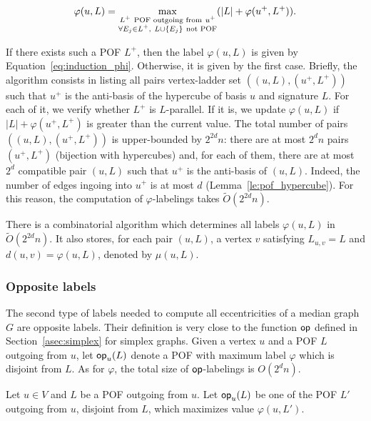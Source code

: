 \documentclass[a4paper,UKenglish,numberwithinsect,cleveref, autoref,anonymous]{lipics-v2021}
\newcommand{\set}[1]{\left\{ #1 \right\}}
\newcommand{\card}[1]{\left| #1 \right|}
\newcommand{\opp}{\mbox{\textsf{op}}}
\begin{document}
\begin{equation}
    \varphi(u,L) = \max\limits_{\substack{L^+ ~\mbox{\scriptsize{POF outgoing from}}~ u^+ \\ \forall E_j \in L^+,~ L \cup \set{E_j} ~\mbox{\scriptsize{not POF}}}} (\card{L} + \varphi(u^+,L^+)).
\label{eq:induction_phi}
\end{equation}

If there exists such a POF $L^+$, then the label $\varphi(u,L)$ is given by Equation~\eqref{eq:induction_phi}. Otherwise, it is given by the first case. Briefly, the algorithm consists in listing all pairs vertex-ladder set $((u,L),(u^+,L^+))$ such that $u^+$ is the anti-basis of the hypercube of basis $u$ and signature $L$. For each of it, we verify whether $L^+$ is $L$-parallel. If it is, we update $\varphi(u,L)$ if $\card{L} + \varphi(u^+,L^+)$ is greater than the current value. The total number of pairs $((u,L),(u^+,L^+))$ is upper-bounded by $2^{2d}n$: there are at most $2^dn$ pairs $(u^+,L^+)$ (bijection with hypercubes) and, for each of them, there are at most $2^d$ compatible pair $(u,L)$ such that $u^+$ is the anti-basis of $(u,L)$. Indeed, the number of edges ingoing into $u^+$ is at most $d$ (Lemma~\ref{le:pof_hypercube}). For this reason, the computation of $\varphi$-labelings takes $\tilde{O}(2^{2d}n)$.

\begin{theorem}
There is a combinatorial algorithm which determines all labels $\varphi(u,L)$ in $\tilde{O}(2^{2d}n)$. It also stores, for each pair $(u,L)$, a vertex $v$ satisfying $L_{u,v} = L$ and $d(u,v) = \varphi(u,L)$, denoted by $\mu(u,L)$.
\label{th:compute_phi}
\end{theorem}

\subsubsection{Opposite labels}

The second type of labels needed to compute all eccentricities of a median graph $G$ are opposite labels. Their definition is very close to the function $\opp$ defined in Section~\ref{asec:simplex} for simplex graphs. Given a vertex $u$ and a POF $L$ outgoing from $u$, let $\opp_u(L)$ denote a POF with maximum label $\varphi$ which is disjoint from $L$. As for $\varphi$, the total size of $\opp$-labelings is $O(2^dn)$.

\begin{definition}[Labels $\opp$~\cite{BeHa21}]
Let $u \in V$ and $L$ be a POF outgoing from $u$. Let $\opp_u(L)$ be one of the POF $L'$ outgoing from $u$, disjoint from $L$, which maximizes value $\varphi(u,L')$.
\end{definition}
\end{document}
